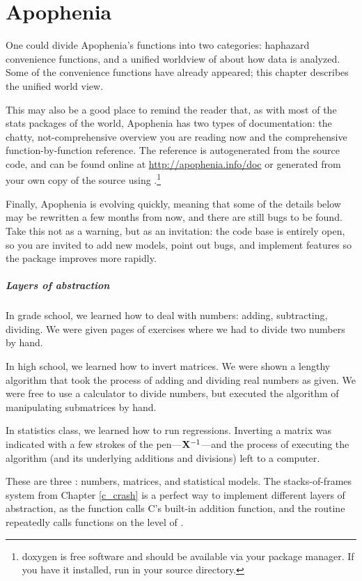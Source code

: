 \chapter{Apophenia} \label{apop} 

One could divide Apophenia's functions into two categories: haphazard
convenience functions, and a unified worldview of about how data is
analyzed. Some of the convenience functions have already appeared; this
chapter describes the unified world view. 

This may also be a good place to remind the reader that, as with
most of the stats packages of the world, Apophenia has two types of
documentation: the chatty, not-comprehensive overview you are reading
now and the comprehensive function-by-function reference. The reference
is autogenerated from the source code, and can be found online at
\url{http://apophenia.info/doc} or generated from your own copy of the
source using .\footnote{doxygen is free software and
should be available via your package manager. If you have it installed,
run  in your source directory.}

Finally, Apophenia is evolving quickly, meaning that some of the details
below may be rewritten a few months from now, and there are still bugs
to be found. Take this not as a warning, but as an invitation: the code
base is entirely open, so you are invited to add new models, point out
bugs, and implement features so the package improves more rapidly.

\paragraph{Layers of abstraction} 
In grade school, we learned how to deal with numbers: adding,
subtracting, dividing. We were given pages of exercises where we had to
divide two numbers by hand.

In high school, we learned how to invert matrices. We were shown a
lengthy algorithm that took the process of adding and dividing real
numbers as given. We were free to use a calculator to divide numbers,
but executed the algorithm of manipulating submatrices by hand.

In statistics class, we learned how to run regressions.  Inverting a
matrix was indicated with a few strokes of the pen---${\bf X}^{-1}$---and
the process of executing the algorithm (and its underlying additions and
divisions) left to a computer.

These are three : numbers, matrices, and
statistical models. The stacks-of-frames
system from Chapter \ref{c_crash} is a perfect way to implement
different layers of abstraction, as the  function
calls C's built-in addition function, and the
 routine repeatedly calls functions on the
level of . 

